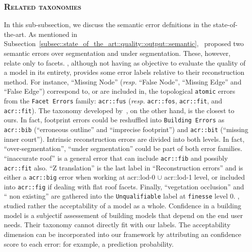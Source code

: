         \subsubsection{\textsc{Related taxonomies}}
            In this sub-subsection, we discuss the semantic error defnitions in the state-of-the-art.
            As mentioned in Subsection~\ref{subsec::state_of_the_art::quality::output::semantic},~\textcite{rottensteiner2012isprs} proposed two semantic errors over segmentation and under segmentation.
            These, however, relate only to facets.
            \textcite{xiong2014graph}, although not having as objective to evaluate the quality of a model in its entirety, provides some error labels relative to their reconstruction method.
            For instance, ``Missing Node'' (\textit{resp.} ``False Node'', ``Missing Edge'' and ``False Edge'') correspond to, or are included in, the topological \texttt{atomic} errors from the \texttt{Facet Errors} family: \texttt{\gls{acr::fus}} (\textit{resp.} \texttt{\gls{acr::fos}}, \texttt{\gls{acr::fit}}, and \texttt{\gls{acr::fit}}).
            The taxonomy developed by~\textcite{michelin2013quality}, on the other hand, is the closest to ours.
            In fact, footprint errors could be reshuffled into \texttt{Building Errors} as \texttt{\gls{acr::bib}} (``erroneous outline'' and ``imprecise footprint'') and \texttt{\gls{acr::bit}} (``missing inner court'').
            Intrinsic reconstruction errors are divided into both levels.
            In fact, ``over-segmentation'', ``under segmentation'' could be part of both error families.
            ``inaccurate roof'' is a general error that can include \texttt{\gls{acr::fib}} and possibly \texttt{\gls{acr::fit}} also.
            ``Z translation'' is the last label in ``Reconstruction errors'' and is either a \texttt{\gls{acr::big}} error when working at \gls{acr::lod}-0 $\cup$ \gls{acr::lod}-1 level, or included into \texttt{\gls{acr::fig}} if dealing with flat roof facets.
            Finally, ``vegetation occlusion'' and `` non existing'' are gathered into the \texttt{Unqualifiable} label at \texttt{finesse} level 0.
            \textcite{boudet2006supervised}, studied rather the acceptability of a model as a whole.
            Confidence in a building model is a subjectif assessement of building models that depend on the end user needs.
            Their taxonomy cannot directly fit with our labels.
            The acceptability dimension can be incorporated into our framework by attributing an confidence score to each error: for example, a prediction probability.        

